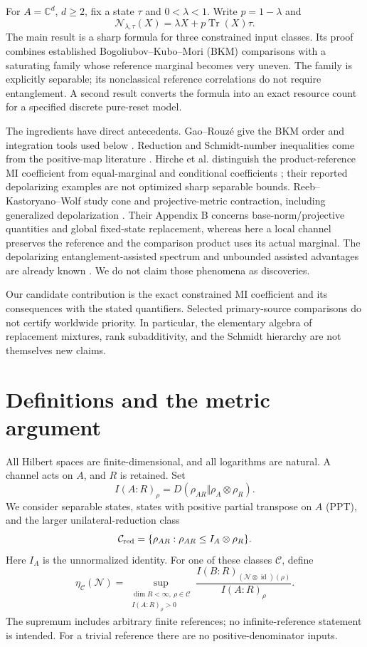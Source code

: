 \documentclass[11pt]{article}
\newcommand{\Tr}{\operatorname{Tr}}
\newcommand{\id}{\operatorname{id}}
\begin{document}
For $A=\mathbb C^d$, $d\ge2$, fix a state $\tau$ and $0<\lambda<1$. Write $p=1-\lambda$ and
\begin{equation}\label{eq:channel}
 \mathcal N_{\lambda,\tau}(X)=\lambda X+p\Tr(X)\tau.
\end{equation}
The main result is a sharp formula for three constrained input classes. Its proof combines established Bogoliubov--Kubo--Mori (BKM) comparisons with a saturating family whose reference marginal becomes very uneven. The family is explicitly separable; its nonclassical reference correlations do not require entanglement. A second result converts the formula into an exact resource count for a specified discrete pure-reset model.

The ingredients have direct antecedents. Gao--Rouz\'e give the BKM order and integration tools used below \cite{gao}. Reduction and Schmidt-number inequalities come from the positive-map literature \cite{reduction,schmidt}. Hirche et al. distinguish the product-reference MI coefficient from equal-marginal and conditional coefficients \cite{conditional}; their reported depolarizing examples are not optimized sharp separable bounds. Reeb--Kastoryano--Wolf study cone and projective-metric contraction, including generalized depolarization \cite{reeb}. Their Appendix B concerns base-norm/projective quantities and global fixed-state replacement, whereas here a local channel preserves the reference and the comparison product uses its actual marginal. The depolarizing entanglement-assisted spectrum and unbounded assisted advantages are already known \cite{bsst}. We do not claim those phenomena as discoveries.

Our candidate contribution is the exact constrained MI coefficient and its consequences with the stated quantifiers. Selected primary-source comparisons do not certify worldwide priority. In particular, the elementary algebra of replacement mixtures, rank subadditivity, and the Schmidt hierarchy are not themselves new claims.

\section{Definitions and the metric argument}
All Hilbert spaces are finite-dimensional, and all logarithms are natural. A channel acts on $A$, and $R$ is retained. Set
\[
 I(A:R)_\rho=D(\rho_{AR}\Vert\rho_A\otimes\rho_R).
\]
We consider separable states, states with positive partial transpose on $A$ (PPT), and the larger unilateral-reduction class
\begin{equation}\label{eq:reduction}
 \mathcal C_{\rm red}=\{\rho_{AR}:\rho_{AR}\le I_A\otimes\rho_R\}.
\end{equation}
Here $I_A$ is the unnormalized identity. For one of these classes $\mathcal C$, define
\begin{equation}\label{eq:eta}
 \eta_{\mathcal C}(\mathcal N)=
 \sup_{\substack{\dim R<\infty,\ \rho\in\mathcal C\\I(A:R)_\rho>0}}
 \frac{I(B:R)_{(\mathcal N\otimes\id)(\rho)}}{I(A:R)_\rho}.
\end{equation}
The supremum includes arbitrary finite references; no infinite-reference statement is intended. For a trivial reference there are no positive-denominator inputs.
\end{document}
